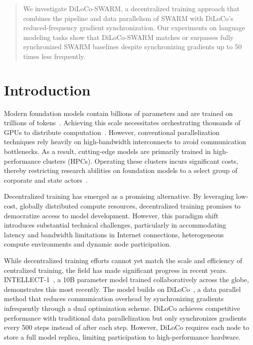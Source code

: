 \documentclass{article}
\begin{document}
\begin{abstract}
  We investigate DiLoCo-SWARM, a decentralized training approach that combines
  the pipeline and data parallelism of SWARM with DiLoCo's reduced-frequency
  gradient synchronization. Our experiments on language modeling tasks show that
  DiLoCo-SWARM matches or surpasses fully synchronized SWARM baselines despite
  synchronizing gradients up to 50 times less frequently.
\end{abstract}

\section{Introduction}

Modern foundation models contain billions of parameters and are trained on trillions of tokens~\cite{chowdhery2022palm,brown2023gpt3,dubey2024llama3,google2024gemini}. Achieving this scale necessitates orchestrating thousands of GPUs to distribute computation~\cite{dubey2024llama3,deepseekai2024}. However, conventional parallelization techniques rely heavily on high-bandwidth interconnects to avoid communication bottlenecks. As a result, cutting-edge models are primarily trained in high-performance clusters (HPCs). Operating these clusters incurs significant costs, thereby restricting research abilities on foundation models to a select group of corporate and state actors~\cite{jaghouar2024intellect1}.

Decentralized training has emerged as a promising alternative. By leveraging low-cost, globally distributed compute resources, decentralized training promises to democratize access to model development. However, this paradigm shift introduces substantial technical challenges, particularly in accommodating latency and bandwidth limitations in Internet connections, heterogeneous compute environments and dynamic node participation.

While decentralized training efforts cannot yet match the 
scale and efficiency of centralized training, the field 
has made significant progress in recent years. INTELLECT-1~\cite{jaghouar2024intellect1}, a 10B parameter model trained collaboratively across the globe, demonstrates this most recently. The model builds on DiLoCo~\cite{douillard2023diloco}, a data parallel method that reduces communication overhead by synchronizing gradients infrequently through a dual optimization scheme. DiLoCo achieves competitive performance with traditional data parallelization but only synchronizes gradients every 500 steps instead of after each step. However, DiLoCo requires each node to store a full model replica, limiting participation to high-performance hardware.
\end{document}
